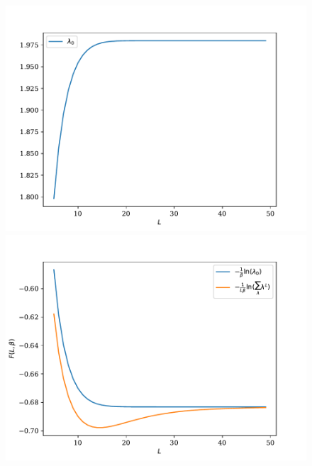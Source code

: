 \begin{figure}
	\begin{minipage}[t]{0.4\linewidth}
		\includegraphics[width=\linewidth]{chap4/freeene-lambda0-mu.pdf}
	\end{minipage}%
	\begin{minipage}[t]{0.4\linewidth}
		\includegraphics[width=\linewidth]{chap4/freeene-thermo-mu.pdf}
	\end{minipage}
	\begin{minipage}{0.4\linewidth}

\end{minipage}
\end{figure}
